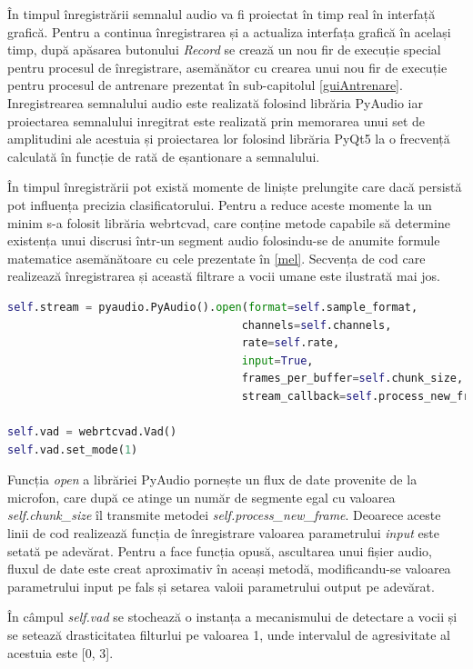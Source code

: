\documentclass[a4paper,12pt]{book}
\begin{document}
		În timpul înregistrării semnalul audio va fi proiectat în timp real în interfață grafică. Pentru a continua înregistrarea și a actualiza interfața grafică în același timp, după apăsarea butonului \textit{Record} se crează un nou fir de execuție special pentru procesul de înregistrare, asemănător cu crearea unui nou fir de execuție pentru procesul de antrenare prezentat în sub-capitolul \ref{guiAntrenare}. Inregistrearea semnalului audio este realizată folosind librăria PyAudio iar proiectarea semnalului inregitrat este realizată prin memorarea unui set de amplitudini ale acestuia și proiectarea lor folosind librăria PyQt5 la o frecvență calculată în funcție de rată de eșantionare a semnalului. \par
		În timpul înregistrării pot există momente de liniște prelungite care dacă persistă pot influența precizia clasificatorului. Pentru a reduce aceste momente la un minim s-a folosit librăria webrtcvad, care conține metode capabile să determine existența unui discrusi într-un segment audio folosindu-se de anumite formule matematice asemănătoare cu cele prezentate în \ref{mel}. Secvența de cod care realizează înregistrarea și această filtrare a vocii umane este ilustrată mai jos.
		\begin{lstlisting}[language=Python, caption={Initializarea fluxului de transmitere a datelor pentru inregistrarea}]	
self.stream = pyaudio.PyAudio().open(format=self.sample_format,
									channels=self.channels,
									rate=self.rate,
									input=True,
									frames_per_buffer=self.chunk_size, 
									stream_callback=self.process_new_frame)

self.vad = webrtcvad.Vad()
self.vad.set_mode(1) \end{lstlisting}
		Funcția \textit{open} a librăriei PyAudio pornește un flux de date provenite de la microfon, care după ce atinge un număr de segmente egal cu valoarea \textit{self.chunk\_size} îl transmite metodei \textit{self.process\_new\_frame}. Deoarece aceste linii de cod realizează funcția de înregistrare valoarea parametrului \textit{input} este setată pe adevărat. Pentru a face funcția opusă, ascultarea unui fișier audio, fluxul de date este creat aproximativ în aceași metodă, modificandu-se valoarea parametrului input pe fals și setarea valoii parametrului output pe adevărat. \par
		
		În câmpul \textit{self.vad} se stochează o instanța a mecanismului de detectare a vocii și se setează drasticitatea filturlui pe valoarea 1, unde intervalul de agresivitate al acestuia este [0, 3]. \par
\end{document}
